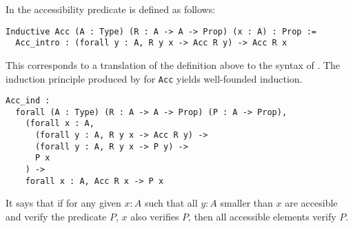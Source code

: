 In \Coq the accessibility predicate is defined as follows:
\begin{verbatim}
Inductive Acc (A : Type) (R : A -> A -> Prop) (x : A) : Prop :=
  Acc_intro : (forall y : A, R y x -> Acc R y) -> Acc R x
\end{verbatim}
This corresponds to a translation of the definition above to the syntax of \Coq.
The induction principle produced by \Coq for \texttt{Acc} yields
well-founded induction.
\begin{verbatim}
Acc_ind :
  forall (A : Type) (R : A -> A -> Prop) (P : A -> Prop),
    (forall x : A,
      (forall y : A, R y x -> Acc R y) ->
      (forall y : A, R y x -> P y) ->
      P x
    ) ->
    forall x : A, Acc R x -> P x
\end{verbatim}
It says that if for any given \(x : A\) such that all \(y : A\) smaller than
\(x\) are accesible and verify the predicate \(P\), \(x\) also verifies \(P\),
then all accessible elements verify \(P\).

